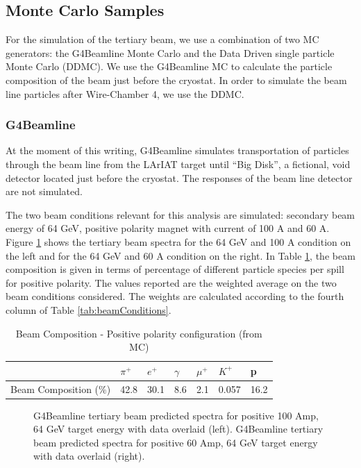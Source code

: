 \subsection{Monte Carlo Samples}\label{sec:MCSamples}
For the simulation of the tertiary beam, we use a combination of two MC generators: the G4Beamline Monte Carlo and the Data Driven single particle Monte Carlo (DDMC).   We use the G4Beamline MC to calculate the particle composition of the beam just before the cryostat. In order to simulate the beam line particles after Wire-Chamber 4, we use the DDMC. 

\subsubsection{G4Beamline }\label{sec:G4Beamline}
At the moment of this writing,  G4Beamline simulates transportation of particles through the beam line from the LArIAT target until ``Big Disk'', a fictional, void detector located just before the cryostat. The responses of  the beam line detector are not simulated. 

The two beam conditions relevant for this analysis are simulated: secondary beam energy of 64 GeV, positive polarity magnet with current of 100 A and 60 A. Figure \ref{fig:beamspectrum} shows the tertiary beam spectra for the 64 GeV and 100 A condition on the left and for the 64 GeV and 60 A condition on the right.
In Table \ref{tab:beamcomp2}, the beam composition is given in terms of percentage of different particle species per spill for positive polarity. The values reported are the weighted average on the two beam conditions considered. The weights are calculated according to the fourth column of Table \ref{tab:beamConditions}. 

\begin{table}[ht!]
\centering
\begin{tabular}{|l|l|l|l|l|l|l|}
\hline
                   & $\pi^+$ & $e^+$ & $\gamma$ & $\mu^+$ & $K^+$ & p \\ \hline
Beam Composition (\%) &    42.8     &  30.1     &    8.6      &    2.1     &    0.057    &    16.2            \\ \hline
\end{tabular}
\caption{Beam Composition - Positive polarity configuration (from MC)}
\label{tab:beamcomp2}
\end{table}



\begin{figure}[htb]
\begin{center}
\end{center}
\caption{G4Beamline tertiary beam  predicted spectra for positive 100 Amp, 64 GeV target energy with data overlaid (left). G4Beamline tertiary beam  predicted spectra for positive 60 Amp, 64 GeV target energy with data overlaid (right).}
\label{fig:beamspectrum}
\end{figure}



